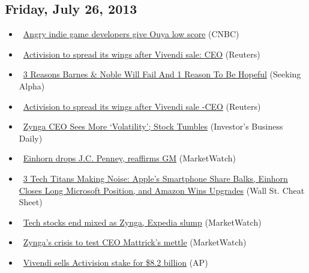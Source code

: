 \documentclass[11pt,asymmetric]{article}
\begin{document}
\subsection*{Friday, July 26, 2013}
\begin{itemize}
\item\ \href{http://www.cnbc.com/id/100917968?__source=yahoo%7Cfinance%7Cheadline%7Cheadline%7Cstory&par=yahoo&doc=100917968%7CAngry+indie+game+develope}{Angry indie game developers give Ouya low score} (CNBC)
\item\ \href{http://finance.yahoo.com/news/activision-spread-wings-vivendi-sale-192333469.html}{Activision to spread its wings after Vivendi sale: CEO} (Reuters)
\item\ \href{http://seekingalpha.com/article/1577802-3-reasons-barnes-noble-will-fail-and-1-reason-to-be-hopeful?source=yahoo}{3 Reasons Barnes \& Noble Will Fail And 1 Reason To Be Hopeful} (Seeking Alpha)
\item\ \href{http://www.reuters.com/article/2013/07/26/activision-vivendi-kotick-idUSL1N0FW1IS20130726?feedType=RSS&feedName=telcommunicationsServicesSector&rpc=43}{Activision to spread its wings after Vivendi sale -CEO} (Reuters)
\item\ \href{http://news.investors.com/article/665354/072613/zynga-reported-second-quarter-earnings-thursday.htm?ven=yahoocp&ven=yahoo}{Zynga CEO Sees More `Volatility'; Stock Tumbles} (Investor's Business Daily)
\item\ \href{http://www.marketwatch.com/News/Story/Story.aspx?guid=C2F0C11E-F628-11E2-9F9D-002128040CF6&siteid=yhoof2}{Einhorn drops J.C. Penney, reaffirms GM} (MarketWatch)
\item\ \href{http://wallstcheatsheet.com/stocks/3-tech-titans-making-noise-apples-smartphone-share-balks-einhorn-closes-long-microsoft-position-and-amazon-wins-upgrades.html/?ref=YF}{3 Tech Titans Making Noise: Apple’s Smartphone Share Balks, Einhorn Closes Long Microsoft Position, and Amazon Wins Upgrades} (Wall St. Cheat Sheet)
\item\ \href{http://www.marketwatch.com/News/Story/Story.aspx?guid=0F40ADEE-F5FD-11E2-9F9D-002128040CF6&siteid=yhoof2}{Tech stocks end mixed as Zynga, Expedia slump} (MarketWatch)
\item\ \href{http://www.marketwatch.com/News/Story/Story.aspx?guid=816354CE-F609-11E2-9F9D-002128040CF6&siteid=yhoof2}{Zynga’s crisis to test CEO Mattrick’s mettle} (MarketWatch)
\item\ \href{http://finance.yahoo.com/news/vivendi-sells-activision-stake-8-100101208.html}{Vivendi sells Activision stake for \$8.2 billion} (AP)

\end{itemize}
\end{document}
